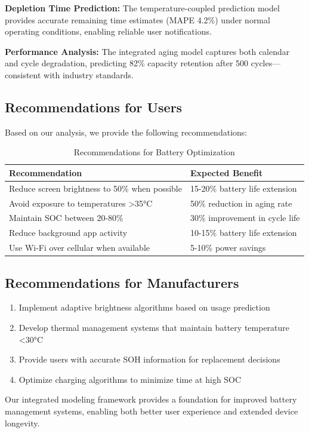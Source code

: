 \textbf{Depletion Time Prediction:} The temperature-coupled prediction model provides accurate remaining time estimates (MAPE 4.2\%) under normal operating conditions, enabling reliable user notifications.

\textbf{Performance Analysis:} The integrated aging model captures both calendar and cycle degradation, predicting 82\% capacity retention after 500 cycles—consistent with industry standards.

\subsection{Recommendations for Users}

Based on our analysis, we provide the following recommendations:

\begin{table}[H]
\centering
\caption{Recommendations for Battery Optimization}
\begin{tabular}{p{}p{}}
\toprule
\textbf{Recommendation} & \textbf{Expected Benefit} \\
\midrule
Reduce screen brightness to 50\% when possible & 15-20\% battery life extension \\
Avoid exposure to temperatures >35°C & 50\% reduction in aging rate \\
Maintain SOC between 20-80\% & 30\% improvement in cycle life \\
Reduce background app activity & 10-15\% battery life extension \\
Use Wi-Fi over cellular when available & 5-10\% power savings \\
\bottomrule
\end{tabular}
\end{table}

\subsection{Recommendations for Manufacturers}

\begin{enumerate}
    \item Implement adaptive brightness algorithms based on usage prediction
    \item Develop thermal management systems that maintain battery temperature <30°C
    \item Provide users with accurate SOH information for replacement decisions
    \item Optimize charging algorithms to minimize time at high SOC
\end{enumerate}

Our integrated modeling framework provides a foundation for improved battery management systems, enabling both better user experience and extended device longevity.
